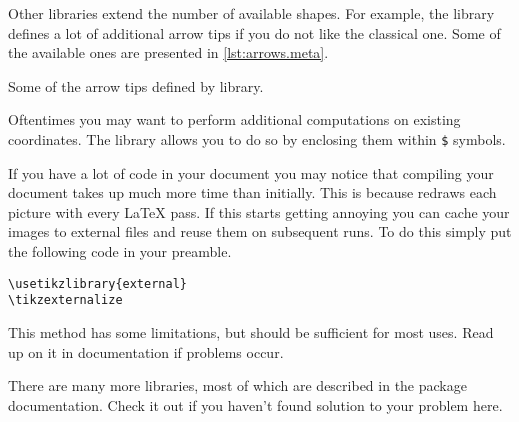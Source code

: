 Other libraries extend the number of available shapes. For example, the
 library defines a lot of additional arrow tips if you do
not like the classical one. Some of the available ones are presented in
\autoref{lst:arrows.meta}.
\begin{listing}
  \begin{example}[vertical_mode, examplewidth=0.8\linewidth]
\usetikzlibrary{arrows.meta}

\end{example}
  \caption{Some of the arrow tips defined by 
    library.}\label{lst:arrows.meta}
\end{listing}
Oftentimes you may want to perform additional computations on existing
coordinates. The  library allows you to do so by enclosing them
within \verb|$| symbols.
\begin{example}[vertical_mode, examplewidth=0.8\linewidth]
\usetikzlibrary{calc}

\end{example}

If you have a lot of \TikZ{} code in your document you may notice that
compiling your document takes up much more time than initially. This is because
\TikZ{} redraws each picture with every \LaTeX{} pass. If this starts getting
annoying you can cache your images to external files and reuse them on
subsequent runs. To do this simply put the following code in your preamble.
\begin{verbatim}
\usetikzlibrary{external}
\tikzexternalize
\end{verbatim}
This method has some limitations, but should be sufficient for most uses. Read
up on it in documentation if problems occur.

There are many more libraries, most of which are described in the 
package documentation. Check it out if you haven't found solution to your
problem here.
